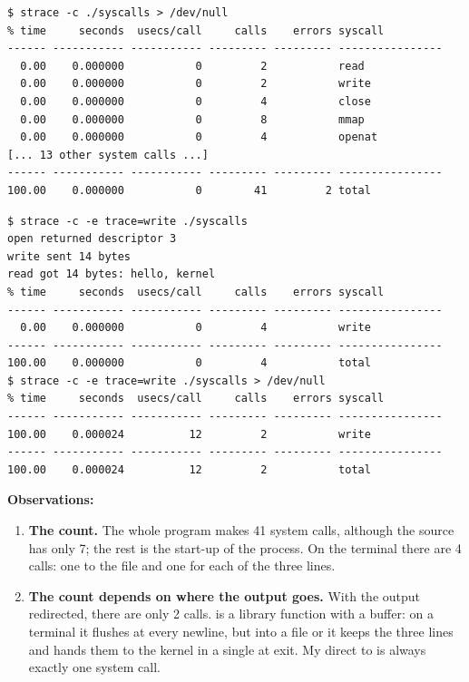 \documentclass[11pt,a4paper]{article}
\begin{document}
\begin{lstlisting}[caption={All the calls of syscalls, counted}]
$ strace -c ./syscalls > /dev/null
% time     seconds  usecs/call     calls    errors syscall
------ ----------- ----------- --------- --------- ----------------
  0.00    0.000000           0         2           read
  0.00    0.000000           0         2           write
  0.00    0.000000           0         4           close
  0.00    0.000000           0         8           mmap
  0.00    0.000000           0         4           openat
[... 13 other system calls ...]
------ ----------- ----------- --------- --------- ----------------
100.00    0.000000           0        41         2 total
\end{lstlisting}

\begin{lstlisting}[caption={Counting only write, on the terminal and redirected}]
$ strace -c -e trace=write ./syscalls
open returned descriptor 3
write sent 14 bytes
read got 14 bytes: hello, kernel
% time     seconds  usecs/call     calls    errors syscall
------ ----------- ----------- --------- --------- ----------------
  0.00    0.000000           0         4           write
------ ----------- ----------- --------- --------- ----------------
100.00    0.000000           0         4           total
$ strace -c -e trace=write ./syscalls > /dev/null
% time     seconds  usecs/call     calls    errors syscall
------ ----------- ----------- --------- --------- ----------------
100.00    0.000024          12         2           write
------ ----------- ----------- --------- --------- ----------------
100.00    0.000024          12         2           total
\end{lstlisting}

\textbf{Observations:}
\begin{enumerate}
  \item \textbf{The count.} The whole program makes 41 system calls, although the source has
  only 7; the rest is the start-up of the process. On the terminal there are 4 
  calls: one to the file and one for each of the three  lines.
  \item \textbf{The count depends on where the output goes.} With the output redirected, there
  are only 2  calls.  is a library function with a buffer: on a
  terminal it flushes at every newline, but into a file or  it keeps the three
  lines and hands them to the kernel in a single  at exit. My direct 
  to  is always exactly one system call.
\end{enumerate}
\end{document}
